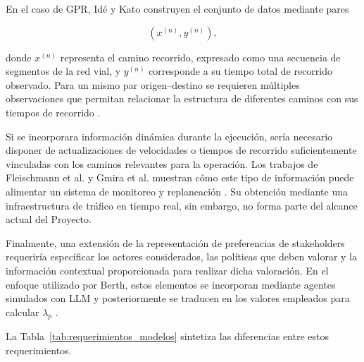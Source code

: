 \documentclass[11pt]{article}
\begin{document}
En el caso de GPR, Idé y Kato construyen el conjunto de datos mediante pares

\[
(x^{(n)},y^{(n)}),
\]

donde \(x^{(n)}\) representa el camino recorrido, expresado como una secuencia de
segmentos de la red vial, y \(y^{(n)}\) corresponde a su tiempo total de recorrido
observado. Para un mismo par origen--destino se requieren múltiples observaciones que
permitan relacionar la estructura de diferentes caminos con sus tiempos de recorrido
\parencite{ide_kato_2009}.

Si se incorporara información dinámica durante la ejecución, sería necesario disponer
de actualizaciones de velocidades o tiempos de recorrido suficientemente vinculadas
con los caminos relevantes para la operación. Los trabajos de Fleischmann et al. y
Gmira et al. muestran cómo este tipo de información puede alimentar un sistema de
monitoreo y replaneación \parencite{fleischmann_gnutzmann_sandvoss_2004,
gmira_et_al_2021}. Su obtención mediante una infraestructura de tráfico en tiempo
real, sin embargo, no forma parte del alcance actual del Proyecto.

Finalmente, una extensión de la representación de preferencias de stakeholders
requeriría especificar los actores considerados, las políticas que deben valorar y la
información contextual proporcionada para realizar dicha valoración. En el enfoque
utilizado por Berth, estos elementos se incorporan mediante agentes simulados con
LLM y posteriormente se traducen en los valores empleados para calcular
\(\lambda_p\) \parencite{berth_thesis_2025,horton_filippas_manning_2023}.

La Tabla~\ref{tab:requerimientos_modelos} sintetiza las diferencias entre estos
requerimientos.
\end{document}
